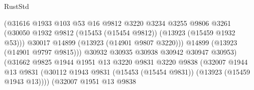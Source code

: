 \begin{lexlean}{RustStd}
\begin{coremodule}
                                            (@31616
                                              @1933
                                              @103
                                              @53
                                              @16
                                              @9812
                                              @3220
                                              @3234
                                              @3255
                                              @9806
                                              @3261
                                              (@30050
                                                @1932
                                                @9812
                                                (@15453 (@15454 @9812))
                                                (@13923 (@15459 @1932 @53)))
                                              @30017
                                              @14899
                                              (@13923 (@14901 @9807 @3220)))
                                            @14899
                                            (@13923 (@14901 @9797 @9815)))
                                          @30932
                                          @30935
                                          @30938
                                          @30942
                                          @30947
                                          @30953)
                                        (@31662
                                          @9825
                                          @1944
                                          @1951
                                          @13
                                          @3220
                                          @9831
                                          @3220
                                          @9838
                                          (@32007
                                            @1944
                                            @13
                                            @9831
                                            (@30112
                                              @1943
                                              @9831
                                              (@15453 (@15454 @9831))
                                              (@13923 (@15459 @1943 @13))))
                                          (@32007
                                            @1951
                                            @13
                                            @9838

\end{coremodule}
\end{lexlean}
